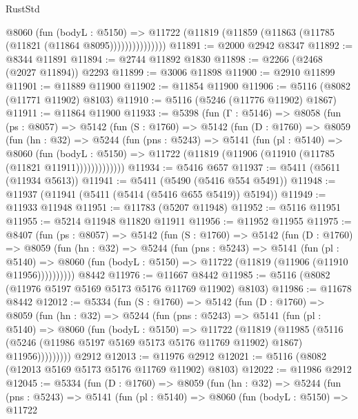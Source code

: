 \begin{lexlean}{RustStd}
\begin{coremodule}
                  @8060
                    (fun (bodyL : @5150) =>
                    @11722 (@11819 (@11859 (@11863 (@11785 (@11821 (@11864 @8095)))))))))))))))
@11891 := @2000 @2942 @8347
@11892 := @8344 @11891
@11894 := @2744 @11892 @1830
@11898 := @2266 (@2468 (@2027 @11894)) @2293
@11899 := @3006 @11898
@11900 := @2910 @11899
@11901 := @11889 @11900
@11902 := @11854 @11900
@11906 := @5116 (@8082 (@11771 @11902) @8103)
@11910 := @5116 (@5246 (@11776 @11902) @1867)
@11911 := @11864 @11900
@11933 := @5398
    (fun (Γ : @5146) =>
    @8058
      (fun (ps : @8057) =>
      @5142
        (fun (S : @1760) =>
        @5142
          (fun (D : @1760) =>
          @8059
            (fun (hn : @32) =>
            @5244
              (fun (pns : @5243) =>
              @5141
                (fun (pl : @5140) =>
                @8060
                  (fun (bodyL : @5150) =>
                  @11722 (@11819 (@11906 (@11910 (@11785 (@11821 @11911)))))))))))))
@11934 := @5416 @657
@11937 := @5411 (@5611 (@11934 @5613))
@11941 := @5411 (@5490 (@5416 @554 @5491))
@11948 := @11937 (@11941 (@5411 (@5414 (@5416 @655 @5419)) @5194))
@11949 := @11933 @11948
@11951 := @11783 (@5207 @11948)
@11952 := @5116 @11951
@11955 := @5214 @11948 @11820 @11911
@11956 := @11952 @11955
@11975 := @8407
    (fun (ps : @8057) =>
    @5142
      (fun (S : @1760) =>
      @5142
        (fun (D : @1760) =>
        @8059
          (fun (hn : @32) =>
          @5244
            (fun (pns : @5243) =>
            @5141
              (fun (pl : @5140) =>
              @8060 (fun (bodyL : @5150) => @11722 (@11819 (@11906 (@11910 @11956))))))))))
    @8442
@11976 := @11667 @8442
@11985 := @5116 (@8082 (@11976 @5197 @5169 @5173 @5176 @11769 @11902) @8103)
@11986 := @11678 @8442
@12012 := @5334
    (fun (S : @1760) =>
    @5142
      (fun (D : @1760) =>
      @8059
        (fun (hn : @32) =>
        @5244
          (fun (pns : @5243) =>
          @5141
            (fun (pl : @5140) =>
            @8060
              (fun (bodyL : @5150) =>
              @11722
                (@11819
                  (@11985
                    (@5116
                      (@5246 (@11986 @5197 @5169 @5173 @5176 @11769 @11902) @1867)
                      @11956)))))))))
    @2912
@12013 := @11976 @2912
@12021 := @5116 (@8082 (@12013 @5169 @5173 @5176 @11769 @11902) @8103)
@12022 := @11986 @2912
@12045 := @5334
    (fun (D : @1760) =>
    @8059
      (fun (hn : @32) =>
      @5244
        (fun (pns : @5243) =>
        @5141
          (fun (pl : @5140) =>
          @8060
            (fun (bodyL : @5150) =>
            @11722

\end{coremodule}
\end{lexlean}
